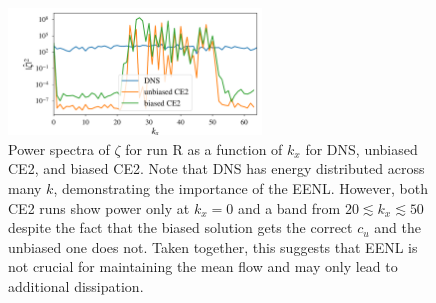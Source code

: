 \documentclass{jfm}
\newcommand{\cu}{c_u}
\begin{document}
\begin{figure}
  \centering
  \includegraphics[width=0.6\textwidth]{kx_power_spectra_zeta_dns_run_R.pdf}
  \caption{Power spectra of $\zeta$ for run R as a function of $k_x$ for DNS, unbiased CE2, and biased CE2. Note that DNS has energy distributed across many $k$, demonstrating the importance of the EENL. However, both CE2 runs show power only at $k_x = 0$ and a band from $20 \lesssim k_x \lesssim 50$ despite the fact that the biased solution gets the correct $\cu$ and the unbiased one does not. Taken together, this suggests that EENL is not crucial for maintaining the mean flow and may only lead to additional dissipation.}
  \label{fig:power_spec_S}
\end{figure}
\end{document}
